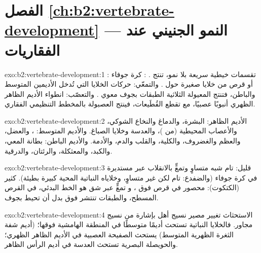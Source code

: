 \section*{الفصل \ref{ch:b2:vertebrate-development} --- النمو الجنيني عند الفقاريات}

\begin{solution}{exo:b2:vertebrate-development:1}
: تقسمات خيطية سريعة بلا نمو، تنتج .
: كرة جوفاء أو قرص من خلايا صغيرة حول
. والتمعّي: حركات الخلايا التي تُدخل الأديمين المتوسط
والباطن، فتنتج المعيولة الثلاثية الطبقات بجوف معوي
. والتعصّب: انطواء الأديم الظاهر الظهري
أنبوبًا عصبيًا، مع تقطع القُطَيعات،
فينتج العصبولة بالمخطط التنظيمي الفقاري.
\end{solution}

\begin{solution}{exo:b2:vertebrate-development:2}
الأديم الظاهر: البشرة، والدماغ والنخاع الشوكي، والأعصاب المحيطية
(من )، والعدسة وخلايا الصباغ. والأديم المتوسط: ، والعضل، والعظم والغضروف، والكلية، والقلب والدم، والأدمة.
والأديم الباطن: بطانة المعي، والكبد، والمعثكلة، والرئتان، والدرقية.
\end{solution}

\begin{solution}{exo:b2:vertebrate-development:3}
 قليل:  تام شبه متساوٍ وتمعٍّ
بالانقلاب عبر  مستديرة في كرة جوفاء (والضفدع:
تام لكن غير متساوٍ، وخلاياه النباتية المحية كبيرة بطيئة). 
كثير (الكتكوت):  محصور في قرص فوق ، و
تمعٍّ عبر شق هو الخط البدئي، في القرص
المسطح، والطبقات تنتشر فوق  بدل أن تحيط
بجوف.
\end{solution}

\begin{solution}{exo:b2:vertebrate-development:4}
الاستحثاث تغيير مصير نسيج أهل بإشارة
من نسيج مجاور. فالخلايا النباتية تستحث أديمًا متوسطًا في
المنطقة الهامشية فوقها؛  (أديم شفة الثغرة الظهرية المتوسط) يستحث
الصفيحة العصبية في الأديم الظاهر الظهري؛ والحويصلة البصرية تستحث
العدسة في أديم الرأس الظاهر.
\end{solution}

